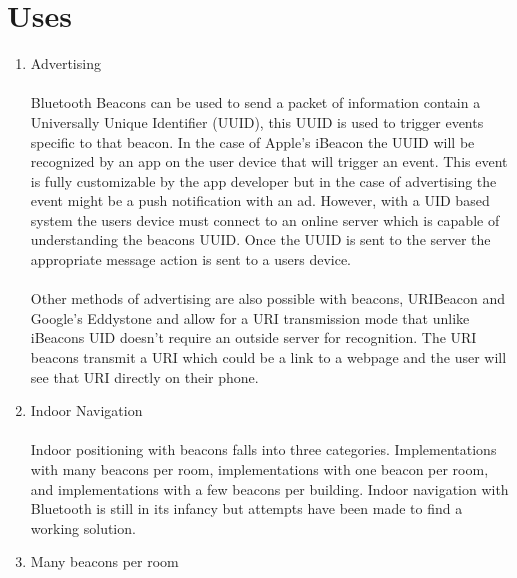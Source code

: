 \documentclass[a4paper,12pt]{report}
\begin{document}
\section{Uses}
\begin{enumerate}
	\item Advertising
	\paragraph{}Bluetooth Beacons can be used to send a packet of information contain a Universally Unique Identifier (UUID), this UUID is used to trigger events specific to that beacon. In the case of Apple's iBeacon the UUID will be recognized by an app on the user device that will trigger an event. This event is fully customizable by the app developer but in the case of advertising the event might be a push notification with an ad. However, with a UID based system the users device must connect to an online server which is capable of understanding the beacons UUID. Once the UUID is sent to the server the appropriate message action is sent to a users device.
	\paragraph{}Other methods of advertising are also possible with beacons, URIBeacon and Google's Eddystone and allow for a URI transmission mode that unlike iBeacons UID doesn't require an outside server for recognition. The URI beacons transmit a URI which could be a link to a webpage and the user will see that URI directly on their phone.
	\item Indoor Navigation
	\paragraph{}Indoor positioning with beacons falls into three categories. Implementations with many beacons per room, implementations with one beacon per room, and implementations with a few beacons per building. Indoor navigation with Bluetooth is still in its infancy but attempts have been made to find a working solution.
	\item Many beacons per room

\end{enumerate}
\end{document}

